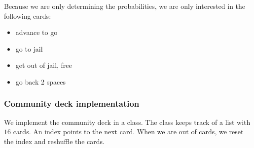 \documentclass[11pt]{article}
\providecommand{\tightlist}{%
      \setlength{\itemsep}{0pt}\setlength{\parskip}{0pt}}
\begin{document}
    Because we are only determining the probabilities, we are only
interested in the following cards:

\begin{itemize}
\tightlist
\item
  advance to go
\item
  go to jail
\item
  get out of jail, free
\item
  go back 2 spaces
\end{itemize}

    \hypertarget{community-deck-implementation}{%
\subsubsection{Community deck
implementation}\label{community-deck-implementation}}

    We implement the community deck in a class. The class keeps track of a
list with \(16\) cards. An index points to the next card. When we are
out of cards, we reset the index and reshuffle the cards.
\end{document}
